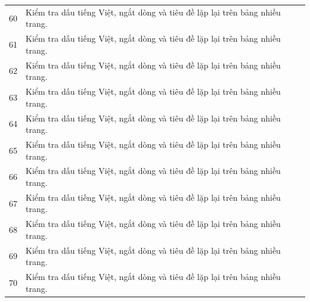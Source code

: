\documentclass{template/ctu-report}
\begin{document}
\begin{longtable}{p{}p{}}
60 & Kiểm tra dấu tiếng Việt, ngắt dòng và tiêu đề lặp lại trên bảng nhiều trang. \\
61 & Kiểm tra dấu tiếng Việt, ngắt dòng và tiêu đề lặp lại trên bảng nhiều trang. \\
62 & Kiểm tra dấu tiếng Việt, ngắt dòng và tiêu đề lặp lại trên bảng nhiều trang. \\
63 & Kiểm tra dấu tiếng Việt, ngắt dòng và tiêu đề lặp lại trên bảng nhiều trang. \\
64 & Kiểm tra dấu tiếng Việt, ngắt dòng và tiêu đề lặp lại trên bảng nhiều trang. \\
65 & Kiểm tra dấu tiếng Việt, ngắt dòng và tiêu đề lặp lại trên bảng nhiều trang. \\
66 & Kiểm tra dấu tiếng Việt, ngắt dòng và tiêu đề lặp lại trên bảng nhiều trang. \\
67 & Kiểm tra dấu tiếng Việt, ngắt dòng và tiêu đề lặp lại trên bảng nhiều trang. \\
68 & Kiểm tra dấu tiếng Việt, ngắt dòng và tiêu đề lặp lại trên bảng nhiều trang. \\
69 & Kiểm tra dấu tiếng Việt, ngắt dòng và tiêu đề lặp lại trên bảng nhiều trang. \\
70 & Kiểm tra dấu tiếng Việt, ngắt dòng và tiêu đề lặp lại trên bảng nhiều trang. \\

\end{longtable}
\PrintReportBibliography
\end{document}
